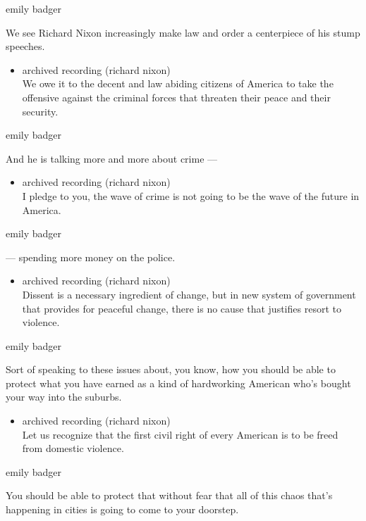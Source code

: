 emily badger

We see Richard Nixon increasingly make law and order a centerpiece of
his stump speeches.

\begin{itemize}
\tightlist
\item
  archived recording (richard nixon)\\
  We owe it to the decent and law abiding citizens of America to take
  the offensive against the criminal forces that threaten their peace
  and their security.
\end{itemize}

emily badger

And he is talking more and more about crime ---

\begin{itemize}
\tightlist
\item
  archived recording (richard nixon)\\
  I pledge to you, the wave of crime is not going to be the wave of the
  future in America.
\end{itemize}

emily badger

--- spending more money on the police.

\begin{itemize}
\tightlist
\item
  archived recording (richard nixon)\\
  Dissent is a necessary ingredient of change, but in new system of
  government that provides for peaceful change, there is no cause that
  justifies resort to violence.
\end{itemize}

emily badger

Sort of speaking to these issues about, you know, how you should be able
to protect what you have earned as a kind of hardworking American who's
bought your way into the suburbs.

\begin{itemize}
\tightlist
\item
  archived recording (richard nixon)\\
  Let us recognize that the first civil right of every American is to be
  freed from domestic violence.
\end{itemize}

emily badger

You should be able to protect that without fear that all of this chaos
that's happening in cities is going to come to your doorstep.

